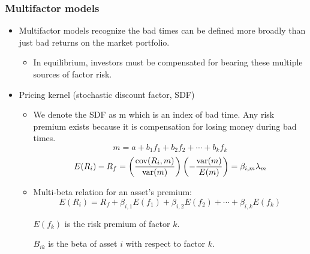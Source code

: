 \subsubsection{Multifactor models}
\begin{itemize}
\item Multifactor models recognize the bad times can be defined more broadly than just bad returns on the market portfolio.
    \begin{itemize}
    \item In equilibrium, investors must be compensated for bearing these multiple sources of factor risk.
    \end{itemize}
    
\item Pricing kernel (stochastic discount factor, SDF)
    \begin{itemize}
    \item We denote the SDF as m which is an index of bad time. Any risk premium exists because it is compensation for losing money during bad times.
    \[ m = a + b_1 f_1 + b_2 f_2 + \cdots + b_k f_k \]
\[ E(R_i) - R_f = \left( \frac{\mathrm{cov}(R_i, m)}{\mathrm{var}(m)} \right) \left( - \frac{\mathrm{var}(m)}{E(m)} \right) \notag 
= \beta_{i,m} \lambda_m \]
    \item Multi-beta relation for an asset's premium:
    \[E(R_i) = R_f + \beta_{i,1} E(f_1) + \beta_{i,2} E(f_2) + \cdots + \beta_{i,k} E(f_k)\]
    \begin{center}
        
$E(f_k)$ is the risk premium of factor $k$.

$B_{ik}$ is the beta of asset $i$ with respect to factor $k$.
\end{center}

    \end{itemize}
    
\end{itemize}



